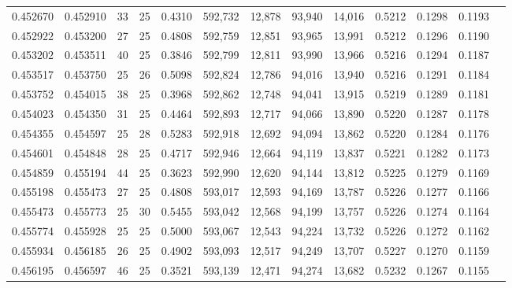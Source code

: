 \begin{tabular}{rrrrrrrrrrrrr}
0.452670 & 0.452910 &    33 &  25 &                                     0.4310 & 592,732 &  12,878 &  93,940 &  14,016 & 0.5212 & 0.1298 & 0.1193 \\
0.452922 & 0.453200 &    27 &  25 &                                     0.4808 & 592,759 &  12,851 &  93,965 &  13,991 & 0.5212 & 0.1296 & 0.1190 \\
0.453202 & 0.453511 &    40 &  25 &                                     0.3846 & 592,799 &  12,811 &  93,990 &  13,966 & 0.5216 & 0.1294 & 0.1187 \\
0.453517 & 0.453750 &    25 &  26 &                                     0.5098 & 592,824 &  12,786 &  94,016 &  13,940 & 0.5216 & 0.1291 & 0.1184 \\
0.453752 & 0.454015 &    38 &  25 &                                     0.3968 & 592,862 &  12,748 &  94,041 &  13,915 & 0.5219 & 0.1289 & 0.1181 \\
0.454023 & 0.454350 &    31 &  25 &                                     0.4464 & 592,893 &  12,717 &  94,066 &  13,890 & 0.5220 & 0.1287 & 0.1178 \\
0.454355 & 0.454597 &    25 &  28 &                                     0.5283 & 592,918 &  12,692 &  94,094 &  13,862 & 0.5220 & 0.1284 & 0.1176 \\
0.454601 & 0.454848 &    28 &  25 &                                     0.4717 & 592,946 &  12,664 &  94,119 &  13,837 & 0.5221 & 0.1282 & 0.1173 \\
0.454859 & 0.455194 &    44 &  25 &                                     0.3623 & 592,990 &  12,620 &  94,144 &  13,812 & 0.5225 & 0.1279 & 0.1169 \\
0.455198 & 0.455473 &    27 &  25 &                                     0.4808 & 593,017 &  12,593 &  94,169 &  13,787 & 0.5226 & 0.1277 & 0.1166 \\
0.455473 & 0.455773 &    25 &  30 &                                     0.5455 & 593,042 &  12,568 &  94,199 &  13,757 & 0.5226 & 0.1274 & 0.1164 \\
0.455774 & 0.455928 &    25 &  25 &                                     0.5000 & 593,067 &  12,543 &  94,224 &  13,732 & 0.5226 & 0.1272 & 0.1162 \\
0.455934 & 0.456185 &    26 &  25 &                                     0.4902 & 593,093 &  12,517 &  94,249 &  13,707 & 0.5227 & 0.1270 & 0.1159 \\
0.456195 & 0.456597 &    46 &  25 &                                     0.3521 & 593,139 &  12,471 &  94,274 &  13,682 & 0.5232 & 0.1267 & 0.1155 \\

\end{tabular}
